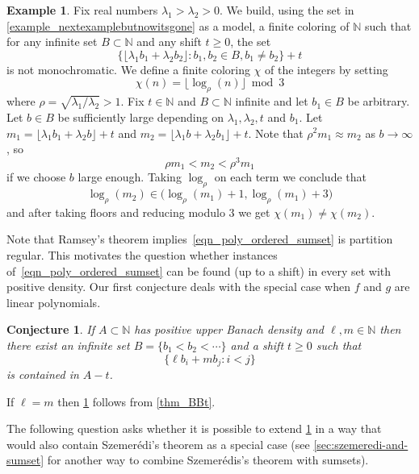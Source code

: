 \documentclass[10pt,dvipsnames]{article}
\newtheorem{conjecture}[theorem]{Conjecture}
\theoremstyle{definition}
\newtheorem{example}[theorem]{Example}
\theoremstyle{plain}
\newcommand{\N}{\mathbb{N}}
\newcommand{\Szemeredi}{Szemer\'{e}di}
\begin{document}
\begin{example}\label{proposition_thesameexampleagain}
Fix real numbers $\lambda_1 > \lambda_2 > 0$.
We build, using the set in \cref{example_nextexamplebutnowitsgone} as a model, a finite coloring of $\N$ such that for any infinite set $B\subset\N$ and any shift $t\geq 0$, the set
    $$\big\{\lfloor\lambda_1b_1+\lambda_2b_2\rfloor:b_1,b_2\in B,b_1\neq b_2\big\}+t$$
    is not monochromatic.
We define a finite coloring $\chi$ of the integers by setting
\[
\chi(n)=\lfloor\log_{\rho}(n)\rfloor\bmod 3
\]
where $\rho=\sqrt{\lambda_1/\lambda_2}>1$.
Fix $t\in\N$ and $B\subset\N$ infinite and let $b_1\in B$ be arbitrary.
Let $b\in B$ be sufficiently large depending on $\lambda_1,\lambda_2,t$ and $b_1$.
Let $m_1=\lfloor\lambda_1b_1+\lambda_2b\rfloor+t$ and $m_2=\lfloor\lambda_1b+\lambda_2b_1\rfloor+t$.
Note that $\rho^2m_1\approx m_2$ as $b\to\infty$, so
\[
\rho m_1<m_2 <\rho^3m_1
\]
if we choose $b$ large enough.
Taking $\log_{\rho}$ on each term we conclude that
\[
\log_{\rho}(m_2)\in\Big(\log_{\rho}(m_1)+1,\log_{\rho}(m_1)+3\Big)
\]
and after taking floors and reducing modulo  3 we get $\chi(m_1)\neq\chi(m_2)$.
\end{example}


Note that Ramsey's theorem implies~\eqref{eqn_poly_ordered_sumset} is partition regular.
This motivates the question whether instances of~\eqref{eqn_poly_ordered_sumset} can be found (up to a shift) in every set with positive density. 
Our first conjecture deals with the special case when $f$ and $g$ are linear polynomials.

\begin{conjecture}
\label{conj:k_box_j}
If $A\subset\N$ has positive upper Banach density and $\ell,m \in\N$ then there exist an infinite set $B = \{b_1 < b_2 < \cdots \}$ and a shift $t\geq 0$ such that
\begin{equation}
\label{eqn:ordered_sum}
\{ \ell b_i + m b_j : i < j \}
\end{equation}
is contained in $A-t$.
\end{conjecture}


If $\ell = m $ then \cref{conj:k_box_j} follows from \cref{thm_BBt}. 

The following question asks whether it is possible to extend \cref{conj:k_box_j} in a way that would also contain \Szemeredi{}'s theorem as a special case (see \cref{sec:szemeredi-and-sumset} for another way to combine Szemer\'edis's theorem with sumsets).
\end{document}
